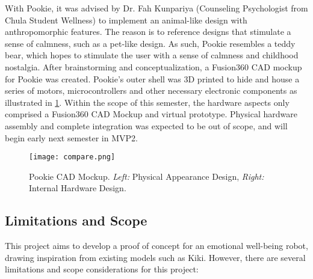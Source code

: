 With Pookie, it was advised by Dr. Fah Kunpariya (Counseling Psychologist from Chula Student Wellness) to implement an animal-like design with anthropomorphic features. The reason is to reference designs that stimulate a sense of calmness, such as a pet-like design. As such, Pookie resembles a teddy bear, which hopes to stimulate the user with a sense of calmness and childhood nostalgia. After brainstorming and conceptualization, a Fusion360 CAD mockup for Pookie was created. Pookie’s outer shell was 3D printed to hide and house a series of motors, microcontrollers and other necessary electronic components as illustrated in \ref{fig:comparison}. Within the scope of this semester, the hardware aspects only comprised a Fusion360 CAD Mockup and virtual prototype. Physical hardware assembly and complete integration was expected to be out of scope, and will begin early next semester in MVP2.

\begin{figure}[!htb]
    \centering
    \texttt{[image: compare.png]}
    \caption{Pookie CAD Mockup. \textit{Left:} Physical Appearance Design, \textit{Right:} Internal Hardware Design.}
    \label{fig:comparison}
\end{figure}

\subsection{Limitations and Scope}

This project aims to develop a proof of concept for an emotional well-being robot, drawing inspiration from existing models such as Kiki. However, there are several limitations and scope considerations for this project:

